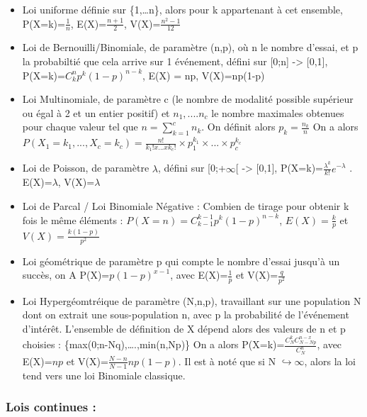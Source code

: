 \documentclass[
]{article}
\providecommand{\tightlist}{%
  \setlength{\itemsep}{0pt}\setlength{\parskip}{0pt}}
\begin{document}
\begin{itemize}
\tightlist
\item
  Loi uniforme définie sur \{1,\ldots n\}, alors pour k appartenant à
  cet ensemble, P(X=k)=\(\frac{1}{n}\), E(X)=\(\frac{n+1}{2}\),
  V(X)=\(\frac{n^2-1}{12}\)
\item
  Loi de Bernouilli/Binomiale, de paramètre (n,p), où n le nombre
  d'essai, et p la probabiltié que cela arrive sur 1 événement, défini
  sur {[}0;n{]} -\textgreater{} {[}0,1{]},
  P(X=k)=\(C_k^np^k(1-p)^{n-k}\), E(X) = np, V(X)=np(1-p)
\item
  Loi Multinomiale, de paramètre c (le nombre de modalité possible
  supérieur ou égal à 2 et un entier positif) et \(n_1,....n_c\) le
  nombre maximales obtenues pour chaque valeur tel que
  \(n=\sum_{k=1}^c n_k\). On définit alors \(p_k=\frac{n_k}{n}\) On a
  alors
  \(P(X_1=k_1,...,X_c=k_c)=\frac{n!}{k_1!x...xk_c!} \times p_1^{k_1} \times ... \times p_c^{k_c}\)
\item
  Loi de Poisson, de paramètre \(\lambda\), défini sur
  {[}0;+\(\infty\){[} -\textgreater{} {[}0,1{]},
  P(X=k)=\(\frac{\lambda^k}{k!}e^{-\lambda}\) . E(X)=\(\lambda\),
  V(X)=\(\lambda\)
\item
  Loi de Parcal / Loi Binomiale Négative : Combien de tirage pour
  obtenir k fois le même éléments :
  \(P(X=n)=C^{k-1}_{k-1}p^k(1-p)^{n-k}\), \(E(X)=\frac{k}{p}\) et
  \(V(X)=\frac{k(1-p)}{p^2}\)
\item
  Loi géométrique de paramètre p qui compte le nombre d'essai jusqu'à un
  succès, on A P(X)=\(p(1-p)^{x-1}\), avec E(X)=\(\frac{1}{p}\) et
  V(X)=\(\frac{q}{p^2}\)
\item
  Loi Hypergéomtréique de paramètre (N,n,p), travaillant sur une
  population N dont on extrait une sous-population n, avec p la
  probabilité de l'événement d'intérêt. L'ensemble de définition de X
  dépend alors des valeurs de n et p choisies :
  \{max(0;n-Nq),\ldots.,min(n,Np)\} On a alors
  P(X=k)=\(\frac{C^k_NC^{n-x}_{N-Np}}{C^n_N}\), avec E(X)=\(np\) et
  V(X)=\(\frac{N-n}{N-1}np(1-p)\). Il est à noté que si N
  \(\hookrightarrow \infty\), alors la loi tend vers une loi Binomiale
  classique.
\end{itemize}

\hypertarget{lois-continues}{%
\subsubsection{Lois continues :}\label{lois-continues}}
\end{document}
